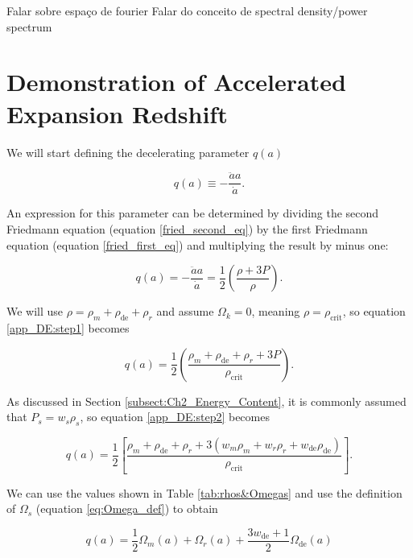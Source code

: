 \documentclass[openany,a4paper,12pt,oneside]{book}
\begin{document}
\begin{spacing}{1.5}
Falar sobre espaço de fourier
Falar do conceito de spectral density/power spectrum
\fi

\chapter{Demonstration of Accelerated Expansion Redshift}\label{app:dark_energy_era}

We will start defining the decelerating parameter $q(a)$

\begin{equation}\label{def:decelerating_parameter}
	q(a)\equiv -\frac{\ddot{a}a}{\dot{a}}.
\end{equation} 

An expression for this parameter can be determined by dividing the second Friedmann equation (equation \eqref{fried_second_eq}) by the first Friedmann equation (equation \eqref{fried_first_eq}) and multiplying the result by minus one:

\begin{equation}\label{app_DE:step1}
	q(a)=-\frac{\ddot{a}a}{\dot{a}}=\frac{1}{2}\left(\frac{\rho+3P}{\rho}\right).
\end{equation}

We will use $\rho=\rho_m+\rho_\text{de}+\rho_r$ and assume $\Omega_k=0$, meaning $\rho=\rho_\text{crit}$, so equation \eqref{app_DE:step1} becomes

\begin{equation}\label{app_DE:step2}
	q(a)=\frac{1}{2}\left(\frac{\rho_m+\rho_\text{de}+\rho_r+3P}{\rho_\text{crit}}\right).
\end{equation}

As discussed in Section \ref{subsect:Ch2_Energy_Content}, it is commonly assumed that $P_s=w_s\rho_s$, so equation \eqref{app_DE:step2} becomes

\begin{equation}\label{app_DE:step3}
	q(a)=\frac{1}{2}\left[\frac{\rho_m+\rho_\text{de}+\rho_r+3(w_m\rho_m+w_r\rho_r+w_\text{de}\rho_\text{de})}{\rho_\text{crit}}\right].
\end{equation}

We can use the values shown in Table \ref{tab:rhos&Omegas} and use the definition of $\Omega_s$ (equation \eqref{eq:Omega_def}) to obtain

\begin{equation}\label{q(a)_expression}
	q(a)=\frac{1}{2}\Omega_m(a)+\Omega_r(a)+\frac{3w_\text{de}+1}{2}\Omega_\text{de}(a)
\end{equation}


\end{spacing}
\end{document}
